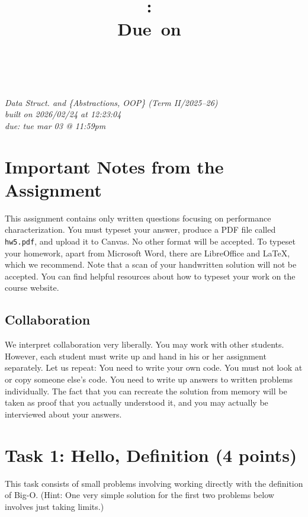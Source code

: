 \documentclass{article}
\title{
    \vspace{2in}
    \textmd{\textbf{\hmwkClass:\ \hmwkTitle}}\\
    \normalsize\vspace{0.1in}\small{Due\ on\ \hmwkDueDate}\\
    \vspace{0.1in}\large{\textit{\hmwkClassInstructor\ \hmwkClassTime}}
    \vspace{3in}
}
\author{\hmwkAuthorName}
\date{}
\theoremstyle{remark}
\begin{document}
\maketitle
\begin{center}
    \textit{Data Struct. and \{Abstractions, OOP\} (Term II/2025--26)}\\
    \textit{built on 2026/02/24 at 12:23:04}\\
    \textit{due: tue mar 03 @ 11:59pm}
\end{center}
\newpage

\section*{Important Notes from the Assignment}

This assignment contains only written questions focusing on performance characterization. You must typeset your answer, produce a PDF file called \texttt{hw5.pdf}, and upload it to Canvas. No other format will be accepted. To typeset your homework, apart from Microsoft Word, there are LibreOffice and \LaTeX, which we recommend. Note that a scan of your handwritten solution will not be accepted. You can find helpful resources about how to typeset your work on the course website.

\subsection*{Collaboration}

We interpret collaboration very liberally. You may work with other students. However, each student must write up and hand in his or her assignment separately. Let us repeat: You need to write your own code. You must not look at or copy someone else’s code. You need to write up answers to written problems individually. The fact that you can recreate the solution from memory will be taken as proof that you actually understood it, and you may actually be interviewed about your answers.

\newpage

\section*{Task 1: Hello, Definition (4 points)}

This task consists of small problems involving working directly with the definition of Big-O. (Hint: One very simple solution for the first two problems below involves just taking limits.)
\end{document}
